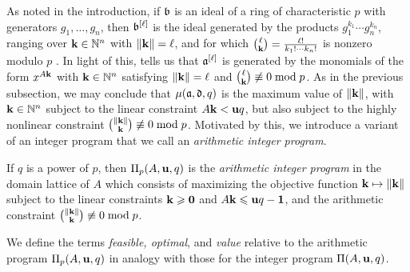 \documentclass{amsart}
\begin{document}
As noted in the introduction, if $\mathfrak{b}$ is an ideal of a ring of characteristic $p$ with generators $g_1, \ldots, g_n$, then $\mathfrak{b}^{[\ell]}$ is the ideal generated by the products $g_1^{k_1}\cdots g_n^{k_n}$, ranging over $\mathbf{k} \in \mathbb{N}^n$ with $\| \mathbf{k} \|=\ell$, and for which  $\binom{\ell}{\mathbf{k}} =
\frac{\ell!}{k_1 ! \cdots k_n !}$ is nonzero modulo $p$  \cite[Proposition~3.5]{hernandez+etal.frobenius_powers}.
In light of this,  tells us that $\mathfrak{a}^{[\ell]}$ is generated by the monomials of the form $x^{A \mathbf{k}}$ with $\mathbf{k} \in \mathbb{N}^n$ satisfying $\| \mathbf{k} \|=\ell$ and $\binom{\ell}{\mathbf{k}} \not\equiv 0 \bmod p$.  As in the previous subsection, we may conclude that $\mu(\mathfrak{a},\mathfrak{d},q)$ is the maximum value of $\| \mathbf{k} \|$, with $\mathbf{k} \in \mathbb{N}^n$ subject to the linear constraint $A\mathbf{k} < \mathbf{u}q$, but also subject to the highly nonlinear constraint $\binom{\| \mathbf{k} \|}{\mathbf{k}} \not\equiv 0 \bmod{p}$.  Motivated by this, we introduce a variant of an integer program that we call an \emph{arithmetic integer program}.

\begin{definition}
\label{aip: D}
If $q$ is a power of $p$, then $\Pi_p(A, \mathbf{u}, q)$ is the \emph{arithmetic integer program} in the domain lattice of $A$ which consists of maximizing the objective function $\mathbf{k} \mapsto \| \mathbf{k} \|$ subject to the linear constraints $\mathbf{k} \geqslant \mathbf{0}$ and $A \mathbf{k} \leqslant \mathbf{u}q - \mathbf{1}$, and the arithmetic constraint $\binom{\| \mathbf{k} \|}{\mathbf{k}} \not \equiv 0 \bmod p$.
\end{definition}

We define the terms \emph{feasible, optimal}, and \emph{value} relative to the arithmetic program $\Pi_p(A, \mathbf{u}, q)$ in analogy with those for the integer program $\Pi(A, \mathbf{u}, q)$.
\end{document}
